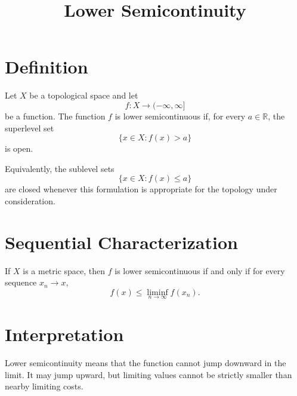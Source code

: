 \documentclass[11pt]{article}
\title{Lower Semicontinuity}
\author{}
\date{}
\begin{document}
\maketitle

\section*{Definition}

Let $X$ be a topological space and let
\[
f:X\to(-\infty,\infty]
\]
be a function. The function $f$ is lower semicontinuous if, for every
$a\in\mathbb R$, the superlevel set
\[
\{x\in X : f(x)>a\}
\]
is open.

Equivalently, the sublevel sets
\[
\{x\in X : f(x)\le a\}
\]
are closed whenever this formulation is appropriate for the topology under
consideration.

\section*{Sequential Characterization}

If $X$ is a metric space, then $f$ is lower semicontinuous if and only if for
every sequence $x_n\to x$,
\[
f(x)
\le
\liminf_{n\to\infty} f(x_n).
\]

\section*{Interpretation}

Lower semicontinuity means that the function cannot jump downward in the
limit. It may jump upward, but limiting values cannot be strictly smaller than
nearby limiting costs.
\end{document}
